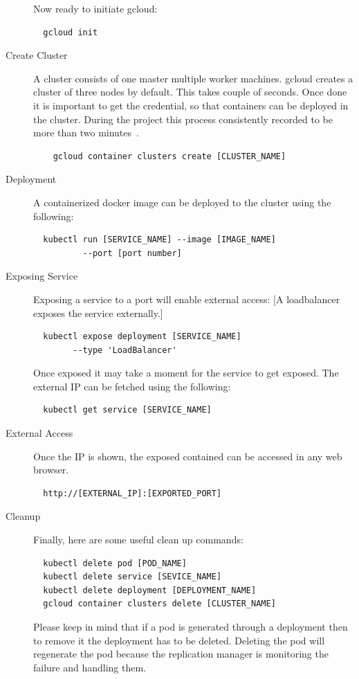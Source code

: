 \begin{description}
Now ready to initiate gcloud:
\begin{verbatim}
  gcloud init
\end{verbatim}

\item[Create Cluster] A cluster consists of one master multiple worker
machines. gcloud creates a cluster of three nodes by default. This takes
couple of seconds. Once done it is important to get the credential, so that
containers can be deployed in the cluster. During the project this process
consistently recorded to be more than two
minutes~\cite{hid-sp18-417-cluster-creation-video}.

  \begin{verbatim}
    gcloud container clusters create [CLUSTER_NAME]
  \end{verbatim}
\item[Deployment] A containerized docker image can be deployed to the cluster
using the following:
\begin{verbatim}
  kubectl run [SERVICE_NAME] --image [IMAGE_NAME] 
          --port [port number]
\end{verbatim}
\item [Exposing Service] Exposing a service to a port will enable external
access: [A loadbalancer exposes the service externally.]
\begin{verbatim}
  kubectl expose deployment [SERVICE_NAME] 
        --type 'LoadBalancer'
\end{verbatim}

Once exposed it may take a moment for the service to get exposed. The external
IP can be fetched using the following:

\begin{verbatim}
  kubectl get service [SERVICE_NAME]
\end{verbatim}

\item [External Access] Once the IP is shown, the exposed contained can be
accessed in any web browser.
\begin{verbatim}
  http://[EXTERNAL_IP]:[EXPORTED_PORT]
\end{verbatim}

\item [Cleanup] Finally, here are some useful clean up commands:
\begin{verbatim}
  kubectl delete pod [POD_NAME]
  kubectl delete service [SEVICE_NAME]
  kubectl delete deployment [DEPLOYMENT_NAME]
  gcloud container clusters delete [CLUSTER_NAME]
\end{verbatim}

  Please keep in mind that if a pod is generated through a deployment then to
  remove it the deployment has to be deleted. Deleting the pod will regenerate
  the pod because the replication manager is monitoring the failure and
  handling them.

\end{description}


